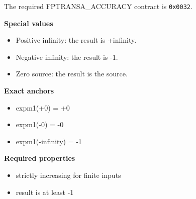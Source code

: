 The required FPTRANSA\_ACCURACY contract is \texttt{0x0032}.

\textbf{Special values}\par
\begin{itemize}
\item Positive infinity: the result is +infinity.
\item Negative infinity: the result is -1.
\item Zero source: the result is the source.
\end{itemize}

\textbf{Exact anchors}\par
\begin{itemize}
\item expm1(+0) = +0
\item expm1(-0) = -0
\item expm1(-infinity) = -1
\end{itemize}

\textbf{Required properties}\par
\begin{itemize}
\item strictly increasing for finite inputs
\item result is at least -1
\end{itemize}

